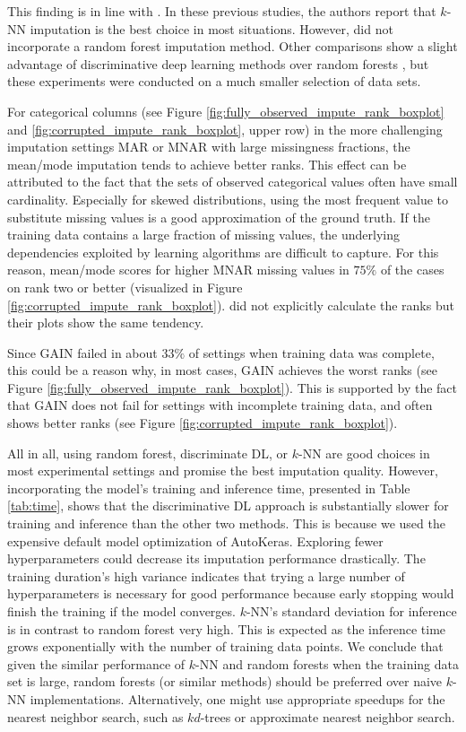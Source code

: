 \documentclass[utf8]{frontiersSCNS} %
\begin{document}
This finding is in line with \cite{Imputation_Benchmark_3, Imputation_Benchmark_2, Imputation_Benchmark_4}. In these previous studies, the authors report that $k$-NN imputation is the best choice in most situations. However, \cite{Imputation_Benchmark_2, Imputation_Benchmark_4} did not incorporate a random forest imputation method. Other comparisons show a slight advantage of discriminative deep learning methods over random forests \citep{biessmann2019datawig}, but these experiments were conducted on a much smaller selection of data sets.

For categorical columns (see Figure \ref{fig:fully_observed_impute_rank_boxplot} and \ref{fig:corrupted_impute_rank_boxplot}, upper row) in the more challenging imputation settings MAR or MNAR with large missingness fractions, the mean/mode imputation tends to achieve better ranks. This effect can be attributed to the fact that the sets of observed categorical values often have small cardinality. Especially for skewed distributions, using the most frequent value to substitute missing values is a good approximation of the ground truth. If the training data contains a large fraction of missing values, the underlying dependencies exploited by learning algorithms are difficult to capture. For this reason, mean/mode scores for higher MNAR missing values in $75\%$ of the cases on rank two or better (visualized in Figure \ref{fig:corrupted_impute_rank_boxplot}). \cite{Imputation_Benchmark_3} did not explicitly calculate the ranks but their plots show the same tendency.

Since GAIN failed in about $33\%$ of settings when training data was complete, this could be a reason why, in most cases, GAIN achieves the worst ranks (see Figure \ref{fig:fully_observed_impute_rank_boxplot}). This is supported by the fact that GAIN does not fail for settings with incomplete training data, and often shows better ranks (see Figure \ref{fig:corrupted_impute_rank_boxplot}).

All in all, using random forest, discriminate DL, or $k$-NN are good choices in most experimental settings and promise the best imputation quality. However, incorporating the model's training and inference time, presented in Table \ref{tab:time}, shows that the discriminative DL approach is substantially slower for training and inference than the other two methods. This is because we used the expensive default model optimization of AutoKeras. Exploring fewer hyperparameters could decrease its imputation performance drastically. The training duration's high variance indicates that trying a large number of hyperparameters is necessary for good performance because early stopping would finish the training if the model converges. $k$-NN's standard deviation for inference is in contrast to random forest very high. This is expected as the inference time grows exponentially with the number of training data points. We conclude that given the similar performance of $k$-NN and random forests when the training data set is large, random forests (or similar methods) should be preferred over naive $k$-NN implementations. Alternatively, one might use appropriate speedups for the nearest neighbor search, such as $kd$-trees or approximate nearest neighbor search.
\end{document}

